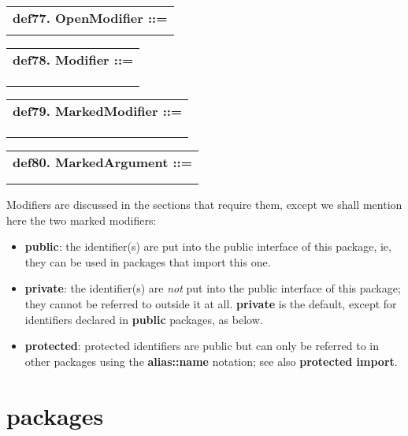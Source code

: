 \documentclass{report}
\begin{document}
\begin{tabular}{l}
{\bf def77. OpenModifier ::= }\\ 
\hspace*{3mm}{\tt MarkedModifier Modifier*} \\ 
\end{tabular}

\begin{tabular}{l}
{\bf def78. Modifier ::= }\\ 
\hspace*{3mm}{\tt MarkedModifier} \\ 
\hspace*{3mm}{\tt  $\mid$ Name {[}(ModArgument){]}} \\ 
\hspace*{3mm}{\tt  $\mid$ "{[}" Modifier** "," "{]}"} \\ 
\end{tabular}

\begin{tabular}{l}
{\bf def79. MarkedModifier ::= }\\ 
\hspace*{3mm}{\tt "public"} \\ 
\hspace*{3mm}{\tt  $\mid$ "private"} \\ 
\hspace*{3mm}{\tt  $\mid$ "protected"} \\ 
\end{tabular}

\begin{tabular}{l}
{\bf def80. MarkedArgument ::= }\\ 
\hspace*{3mm}{\tt Literal} \\ 
\hspace*{3mm}{\tt  $\mid$ "(" Expression ")"} \\ 
\end{tabular}

Modifiers are
discussed in the sections that require them, except we shall mention
here the two marked modifiers:

\begin{itemize}\item {\bf public}: the identifier(s) are put into the public interface of this
package, ie, they can be used in packages that import this one.

\item {\bf private}: the identifier(s) are {\em not} put into the public interface
of this package; they cannot be referred to outside it at all.
{\bf private} is the default, except for identifiers declared in {\bf public}
packages, as below.

\item {\bf protected}: protected identifiers are public but can only be referred to in
other packages using the {\bf alias::name} notation; see also {\bf protected import}.

\end{itemize}\section{packages}
\end{document}
